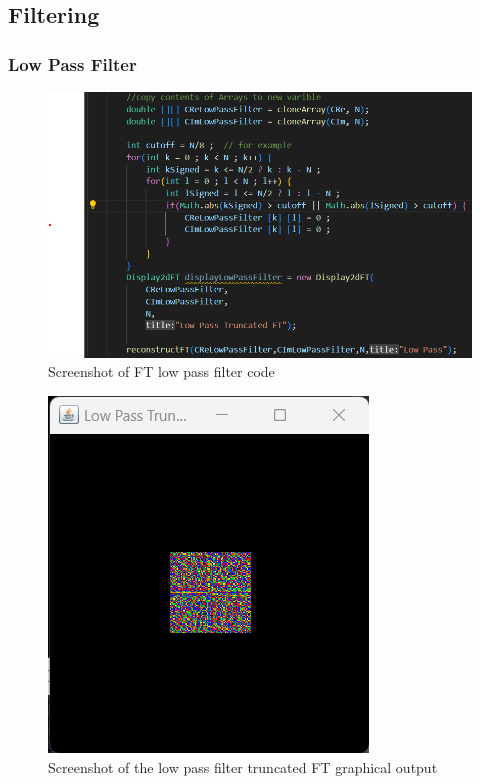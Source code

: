     
    \subsection{Filtering}
   
    \subsubsection{Low Pass Filter}
          \begin{figure}[H]
        \centering
        \includegraphics[width=0.8\columnwidth]{Figures/Week 1/W1-Low-Pass-Code.png}
        \caption{Screenshot of FT low pass filter code}
        \label{fig:Low-Pass-Filter-code}
      \end{figure}

      \begin{figure}[H]
        \centering
        \includegraphics[width=0.8\columnwidth]{Figures/Week 1/W1-Low-Pass-Truncated.png}
        \caption{Screenshot of the low pass filter truncated FT graphical output}
        \label{fig:Low-Pass-Filter-Truncated}
      \end{figure}

